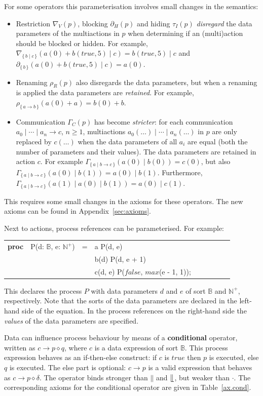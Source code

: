 \documentclass[a4paper,fleqn]{article}
\makeatletter
\newcommand{\f}[1]{\ensuremath{\mathit{#1}}}
\newcommand{\set}[1]{\ensuremath{\{\,#1\,\}}}
\newcommand{\bool}{\ensuremath{\mathbb{B}}}
\newcommand{\true}{\ensuremath{\f{true}}}
\newcommand{\false}{\ensuremath{\f{false}}}
\newcommand{\nat}{\ensuremath{\mathbb{N}}}
\newcommand{\pos}{\ensuremath{\nat^{+}}}
\newcommand{\deffont}[1]{\textbf{#1}}
\newcommand{\seq}{\mathbin{\cdot}}
\newcommand{\alt}{\mathbin{+}}
\newcommand{\pmerge}{\mathbin{\parallel}}
\newcommand{\lmerge}{\mathbin{\llfloor}}
\newcommand{\sync}{\mathbin{\!\mid\!}}
\newcommand{\block}[1]{\partial_{#1}}
\newcommand{\hide}[1]{\tau_{#1}}
\newcommand{\ren}[1]{\rho_{#1}}
\newcommand{\allow}[1]{\nabla_{#1}}
\newcommand{\comm}[1]{\Gamma_{#1}}
\newenvironment{mcrl2}%
{\par\bigskip\noindent%
 \begin{tabular}{@{}>{\bf}p{2.3em}L@{\ }L@{\ }L@{\ }L@{\ }L@{\ }L@{\ }L@{\ }L}%
}%
{\end{tabular}\bigskip\par%
}
\makeatother
\begin{document}
For some operators this parameterisation involves small changes in the
semantics:
\begin{itemize}
\item Restriction $\allow{V}(p)$, blocking $\block{H}(p)$ and hiding
$\hide{I}(p)$
\emph{disregard} the data parameters of the multiactions in $p$ when
determining if an (multi)action should be blocked or hidden. For example, 
$\allow{\set{b \mid c}}(a(0) \alt b(\true,5) \sync c) = b(\true,5) \sync c$ and
$\block{\set{b}}(a(0) \alt b(\true,5) \sync c) = a(0)$.
\item Renaming $\ren{R}(p)$ also disregards the data parameters, but when a
renaming is applied the data parameters are \emph{retained}. For example,
$\ren{\set{a \to b}}(a(0) \alt a) = b(0) \alt b$.
\item Communication $\comm{C}(p)$ has become \emph{stricter}: for each
communication $a_0 \sync \cdots \sync a_n \to c$, $n \geq 1$, multiactions
$a_0(\ldots) \sync \cdots \sync a_n(\ldots)$ in $p$ are only replaced by
$c(\ldots)$ when the data parameters of all $a_i$ are equal (both the number
of parameters and their values). The data parameters are retained in action
$c$. For example $\comm{\set{a \mid b \to c}}(a(0) \sync b(0)) = c(0)$, but
also $\comm{\set{a \mid b \to c}}(a(0) \sync b(1)) = a(0) \sync b(1)$.
Furthermore, $\comm{\set{a \mid b \to c}}(a(1) \sync a(0) \sync b(1)) = a(0)
\sync c(1)$.
\end{itemize}

\noindent
This requires some small changes in the axioms for these operators. The new
axioms can be found in Appendix~\ref{sec:axioms}.

Next to actions, process references can be parameterised. For example:
\begin{mcrl2}
proc & P(d: \bool, e: \pos)
  & =    & a \seq P(d, e)\\
& & \alt & b(d) \seq P(\lnot d, e + 1)\\
& & \alt & c(d, e) \seq P(\false, \f{max}(e - 1, 1));\\
\end{mcrl2}
\noindent This declares the process $P$ with data parameters $d$ and $e$ of
sort $\bool$ and $\pos$, respectively. Note that the sorts of the data
parameters are declared in the left-hand side of the equation. In
the process references on the right-hand side the \emph{values} of the data
parameters are specified.

Data can influence process behaviour by means of a \deffont{conditional}
operator, written as $c \to p \diamond q$, where $c$ is a data expression of sort
$\bool$. This process expression behaves as an if-then-else construct: if $c$
is $\true$ then $p$ is executed, else $q$ is executed. The else part is
optional: $c \to p$ is a valid expression that behaves as $c \to p \diamond \delta$.
The operator binds stronger than $\pmerge$ and $\lmerge$, but weaker than
$\seq$. The corresponding axioms for the conditional operator are given in
Table~\ref{ax.cond}.
\end{document}

